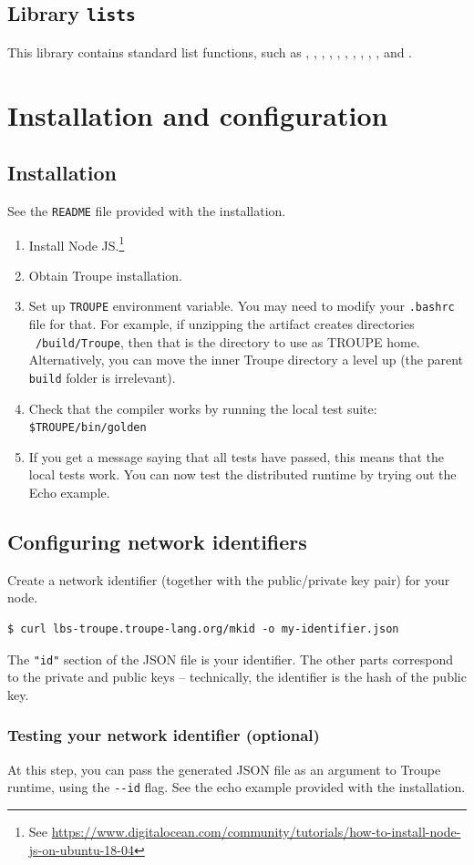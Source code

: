 \subsection{Library {\tt lists}}
This library contains standard list functions, such as , , ,
, , , , , , ,
and .


\clearpage
\section{Installation and configuration}
\label{appendix:installationandconfig}

\subsection{Installation}
See the {\tt README} file provided with the installation.
\begin{enumerate}
    \item Install Node JS.\footnote{
    See \url{https://www.digitalocean.com/community/tutorials/how-to-install-node-js-on-ubuntu-18-04}}
    \item Obtain Troupe installation.
    \item Set up {\tt TROUPE} environment variable. You may need to modify your {\tt .bashrc} file for that. For example, if unzipping the artifact creates directories {\tt ~/build/Troupe}, then that is the directory to use as TROUPE home. Alternatively, you can move the inner Troupe directory a level up (the parent {\tt build} folder is irrelevant).
    \item Check that the compiler works by running the local test suite: {\tt \$TROUPE/bin/golden}
    \item If you get a message saying that all tests have passed, this means that the local tests work. You can now test the distributed runtime by trying out the Echo example.
\end{enumerate}
\fi


\subsection{Configuring network identifiers}
\label{sec:networkid}
Create a network identifier (together with the public/private key pair) for your node.
\begin{verbatim}
$ curl lbs-troupe.troupe-lang.org/mkid -o my-identifier.json
\end{verbatim}

The {\tt "id"} section of the JSON file is your identifier. The other
parts correspond to the private and public keys -- technically,
the identifier is the hash of the public key.


\subsubsection{Testing your network identifier (optional)}
At this step, you can pass the generated JSON file
as an argument to Troupe runtime, using the \verb+--id+ flag. See
the echo example provided with the installation.
